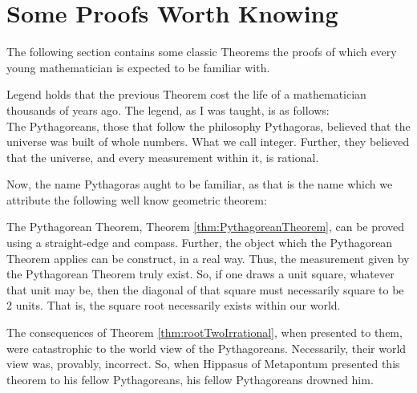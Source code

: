\section{Some Proofs Worth Knowing}

The following section contains some classic Theorems the proofs of which every young mathematician is expected to be familiar with.



Legend holds that the previous Theorem cost the life of a mathematician thousands of years ago.
The legend, as I was taught, is as follows:\\
The Pythagoreans, those that follow the philosophy Pythagoras, believed that the universe was built of whole numbers.
What we call integer.
Further, they believed that the universe, and every measurement within it, is rational.

Now, the name Pythagoras aught to be familiar, as that is the name which we attribute the following well know geometric theorem:

The Pythagorean Theorem, Theorem \ref{thm:PythagoreanTheorem}, can be proved using a straight-edge and compass.
Further, the object which the Pythagorean Theorem applies can be construct, in a real way.
Thus, the measurement given by the Pythagorean Theorem truly exist.
So, if one draws a unit square, whatever that unit may be, then the diagonal of that square must necessarily square to be 2 units.
That is, the square root necessarily exists within our world.

The consequences of Theorem \ref{thm:rootTwoIrrational}, when presented to them, were catastrophic to the world view of the Pythagoreans.
Necessarily, their world view was, provably, incorrect.
So, when Hippasus of Metapontum presented this theorem to his fellow Pythagoreans, his fellow Pythagoreans drowned him.



